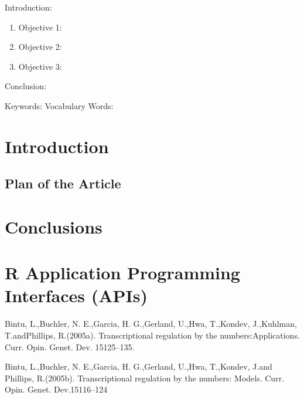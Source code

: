 

\twocolumn
\scriptsize
\begin{frontmatter}
		\title{}
		\author{}
		\address{The Mathematical Learning Space}
\end{frontmatter}	

Introduction:
\begin{enumerate}
\item Objective 1:
\item Objective 2:
\item Objective 3:
\end{enumerate}
Conclusion:

Keywords:
Vocabulary Words:

\section{Introduction}

\subsection{Plan of the Article}


\section{Conclusions}


\section{R Application Programming Interfaces (APIs)}




\begin{thebibliography}{00}

Bintu, L.,Buchler, N. E.,Garcia, H. G.,Gerland, U.,Hwa, T.,Kondev, J.,Kuhlman, T.andPhillips, R.(2005a). 
\newblock Transcriptional regulation by the numbers:Applications. 
\newblock Curr. Opin. Genet. Dev. 15125–135.

Bintu, L.,Buchler, N. E.,Garcia, H. G.,Gerland, U.,Hwa, T.,Kondev, J.and Phillips, R.(2005b). 
\newblock Transcriptional regulation by the numbers: Models.
\newblock Curr. Opin. Genet. Dev.15116–124
\end{thebibliography}

